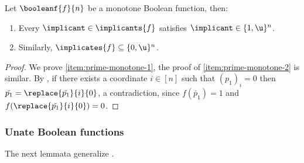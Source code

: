 \documentclass[acmsmall, nonacm, authorversion]{acmart}
\begin{document}
\begin{corollary}\label{cor:prime-monotone}
Let $\booleanf{f}{n}$ be a monotone Boolean function, then:
\begin{enumerate}
    \item Every $\implicant \in \implicants{f}$ satisfies $\implicant\in\{1,\u\}^{n}$. \label{item:prime-monotone-1}
    \item Similarly, $\implicates{f} \subseteq  \{0,\u\}^{n}$. \label{item:prime-monotone-2}
\end{enumerate}
\end{corollary}
\begin{proof}
We prove \eqref{item:prime-monotone-1}, the proof of \eqref{item:prime-monotone-2} is similar. By , if there exists a coordinate $i\in [n]$ such that $(p_1)_i=0$ then $\check{p_1}=\replace{\check{p_1}}{i}{0}$, a contradiction, since $f(\check{p_1})=1$ and $f(\replace{\check{p_1}}{i}{0})=0$.
\end{proof}

\subsubsection{Unate Boolean functions}
The next lemmata generalize . 
\end{document}
